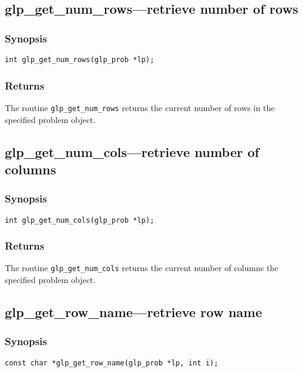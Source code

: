 \subsection{glp\_get\_num\_rows---retrieve number of rows}

\subsubsection*{Synopsis}

\begin{verbatim}
int glp_get_num_rows(glp_prob *lp);
\end{verbatim}

\subsubsection*{Returns}

The routine \verb|glp_get_num_rows| returns the current number of rows
in the specified problem object.

\subsection{glp\_get\_num\_cols---retrieve number of columns}

\subsubsection*{Synopsis}

\begin{verbatim}
int glp_get_num_cols(glp_prob *lp);
\end{verbatim}

\subsubsection*{Returns}

The routine \verb|glp_get_num_cols| returns the current number of
columns the specified problem object.

\subsection{glp\_get\_row\_name---retrieve row name}

\subsubsection*{Synopsis}

\begin{verbatim}
const char *glp_get_row_name(glp_prob *lp, int i);
\end{verbatim}

